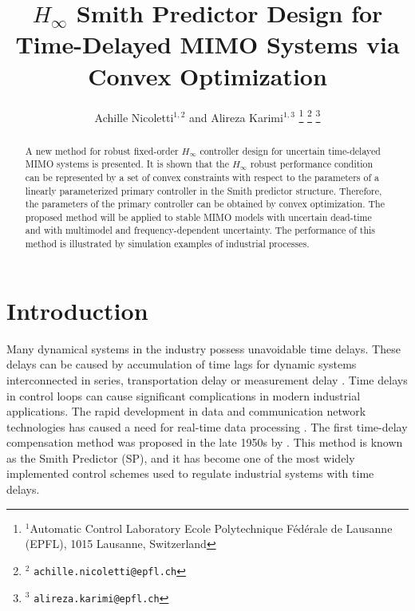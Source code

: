 \documentclass[A4, 10pt, conference]{ieeeconf}
\begin{document}
 

\title{\LARGE \bf $H_{\infty}$ Smith Predictor Design for Time-Delayed MIMO Systems via Convex Optimization}

\author{Achille Nicoletti$^{1,2}$ and Alireza Karimi$^{1,3}$%
\thanks{$^{1}$Automatic Control Laboratory
Ecole Polytechnique F\'{e}d\'{e}rale de Lausanne (EPFL),
1015 Lausanne, Switzerland}%
\thanks{$^{2}$ {\tt\small achille.nicoletti@epfl.ch}}%
\thanks{$^{3}$ {\tt\small alireza.karimi@epfl.ch}}%
}

\maketitle
\thispagestyle{empty}
\pagestyle{empty}

\begin{abstract}
A new method for robust fixed-order $H_{\infty}$ controller design for uncertain time-delayed MIMO systems is presented. It is shown that the $H_{\infty}$ robust performance condition can be represented by a set of convex constraints with respect to the parameters of a linearly parameterized primary controller in the Smith predictor structure. Therefore, the parameters of the primary controller can be obtained by convex optimization. The proposed method will be applied to stable MIMO models with uncertain dead-time and with multimodel and frequency-dependent uncertainty. The performance of this method is illustrated by simulation examples of industrial processes.
\end{abstract}



\section{Introduction}
Many dynamical systems in the industry possess unavoidable time delays. These delays can be caused by accumulation of time lags for dynamic systems interconnected in series, transportation delay or measurement delay \cite{NC07}. Time delays in control loops can cause significant complications in modern industrial applications. The rapid development in data and communication network technologies has caused a need for real-time data processing \cite{LHW08}. The first time-delay compensation method was proposed in the late 1950s by \cite{Smi57}. This method is known as the Smith Predictor (SP), and it has become one of the most widely implemented control schemes used to regulate industrial systems with time delays. 
\end{document}
